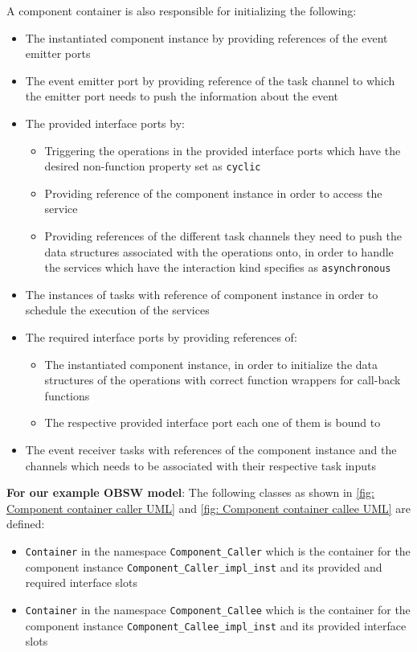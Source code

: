 A component container is also responsible for initializing the following:

\begin{itemize}
\item The instantiated component instance by providing references of the event emitter ports
\item The event emitter port by providing reference of the task channel to which the emitter port needs to push the information about the event
\item The provided interface ports by:
\begin{itemize}
\item Triggering the operations in the provided interface ports which have the desired non-function property set as \texttt{cyclic} 	
\item Providing reference of the component instance in order to access the service
\item Providing references of the different task channels they need to push the data structures associated with the operations onto, in order to handle the services which have the interaction kind specifies as \texttt{asynchronous} 
\end{itemize}
\item The instances of tasks with reference of component instance in order to schedule the execution of the services
\item The required interface ports by providing references of:
\begin{itemize}
\item The instantiated component instance, in order to initialize the data structures of the operations with correct function wrappers for call-back functions
\item The respective provided interface port each one of them is bound to 
\end{itemize}
\item The event receiver tasks with references of the component instance and the channels which needs to be associated with their respective task inputs      
\end{itemize}

\textbf{For our example OBSW model}: The following classes as shown in \cref{fig: Component container caller UML} and \cref{fig: Component container callee UML} are defined:

\begin{itemize}
\item \texttt{Container} in the namespace \texttt{Component\allowbreak\_Caller} which is the container for the component instance \texttt{Component\allowbreak\_Caller\allowbreak\_impl\allowbreak\_inst} and its provided and required interface slots
\item \texttt{Container} in the namespace \texttt{Component\allowbreak\_Callee} which is the container for the component instance \texttt{Component\allowbreak\_Callee\allowbreak\_impl\allowbreak\_inst} and its provided interface slots 
\end{itemize}

